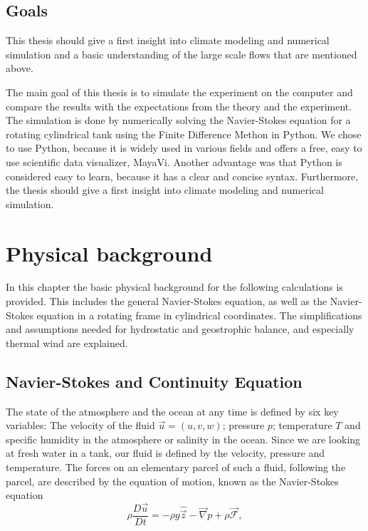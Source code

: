\documentclass[12pt, a4paper]{article} %
\begin{document}
	\subsection{Goals}
	
	This thesis should give a first insight into climate modeling and numerical simulation and a basic understanding of the large scale flows that are mentioned above.
		
	The main goal of this thesis is to simulate the experiment on the computer and compare the results with the expectations from the theory and the experiment. The simulation is done by numerically solving the Navier-Stokes equation for a rotating cylindrical tank using the Finite Difference Methon in Python.
	We chose to use Python, because it is widely used in various fields and offers a free, easy to use scientific data visualizer, MayaVi. Another advantage was that Python is considered easy to learn, because it has a clear and concise syntax.
	Furthermore, the thesis should give a first insight into climate modeling and numerical simulation. 
	
%	
%	

\newpage

\section{Physical background}
	In this chapter the basic physical background for the following calculations is provided. This includes the general Navier-Stokes equation, as well as the Navier-Stokes equation in a rotating frame in cylindrical coordinates. The simplifications and assumptions needed for hydrostatic and geostrophic balance, and especially thermal wind are explained.
	
	\subsection{Navier-Stokes and Continuity Equation}
		
		The state of the atmosphere and the ocean at any time is defined by six key variables:
		The velocity of the fluid $\vec{u}=(u,v,w)$; pressure $p$; temperature $T$ and specific humidity in the atmosphere or salinity in the ocean. Since we are looking at fresh water in a tank, our fluid is defined by the velocity, pressure and temperature. The forces on an elementary parcel of such a fluid, following the parcel, are described by the equation of motion, known as the Navier-Stokes equation
		\begin{equation}
			\rho \frac{D\vec{u}}{Dt} = -\rho g \hat{\vec{z}} - \vec{\nabla} p + \rho \vec{\mathcal{F}} ,
			\label{eq:Simple NSG}
		\end{equation} 
		
\end{document}
